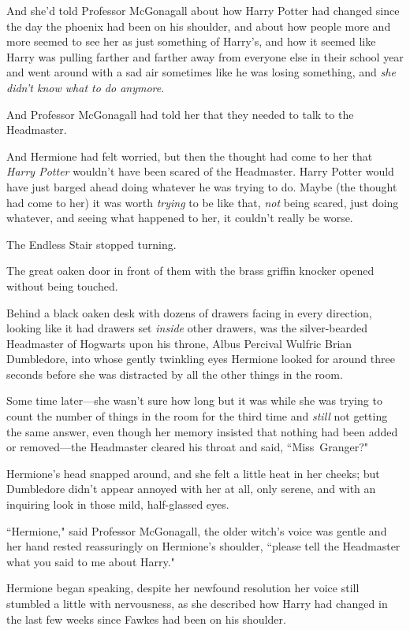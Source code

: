 And she'd told Professor McGonagall about how Harry Potter had changed since the day the phoenix had been on his shoulder, and about how people more and more seemed to see her as just something of Harry's, and how it seemed like Harry was pulling farther and farther away from everyone else in their school year and went around with a sad air sometimes like he was losing something, and \emph{she didn't know what to do anymore}.

And Professor McGonagall had told her that they needed to talk to the Headmaster.

And Hermione had felt worried, but then the thought had come to her that \emph{Harry Potter} wouldn't have been scared of the Headmaster. Harry Potter would have just barged ahead doing whatever he was trying to do. Maybe (the thought had come to her) it was worth \emph{trying} to be like that, \emph{not} being scared, just doing whatever, and seeing what happened to her, it couldn't really be worse.

The Endless Stair stopped turning.

The great oaken door in front of them with the brass griffin knocker opened without being touched.

Behind a black oaken desk with dozens of drawers facing in every direction, looking like it had drawers set \emph{inside} other drawers, was the silver-bearded Headmaster of Hogwarts upon his throne, Albus Percival Wulfric Brian Dumbledore, into whose gently twinkling eyes Hermione looked for around three seconds before she was distracted by all the other things in the room.

Some time later---she wasn't sure how long but it was while she was trying to count the number of things in the room for the third time and \emph{still} not getting the same answer, even though her memory insisted that nothing had been added or removed---the Headmaster cleared his throat and said, ``Miss~Granger?"

Hermione's head snapped around, and she felt a little heat in her cheeks; but Dumbledore didn't appear annoyed with her at all, only serene, and with an inquiring look in those mild, half-glassed eyes.

``Hermione," said Professor McGonagall, the older witch's voice was gentle and her hand rested reassuringly on Hermione's shoulder, ``please tell the Headmaster what you said to me about Harry."

Hermione began speaking, despite her newfound resolution her voice still stumbled a little with nervousness, as she described how Harry had changed in the last few weeks since Fawkes had been on his shoulder.

